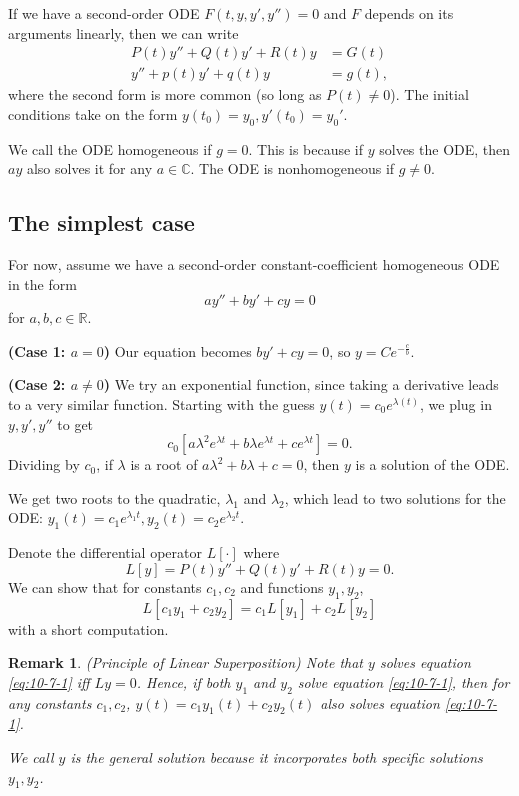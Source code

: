 \documentclass{tufte-handout}
\newcommand*\R{\mathbb{R}}
\newtheorem{rmk}[thm]{Remark}
\theoremstyle{definition}
\begin{document}
If we have a second-order ODE $F(t,y,y',y'') = 0$ and $F$ depends on its arguments linearly, then we can write
\begin{align}
	P(t) y'' + Q(t) y' + R(t) y &= G(t) \\ 
	y'' + p(t) y' + q(t)y &= g(t) \label{eq:10-7-1}
,\end{align} 
where the second form is more common (so long as $P(t) \ne 0$). The initial conditions take on the form $y(t_0) = y_0, y'(t_0) = y_0'$.

We call the ODE homogeneous if $g = 0$. This is because if $y$ solves the ODE, then $ay$ also solves it for any $a \in \mathbb{C}$. The ODE is nonhomogeneous if $g \ne 0$.

\subsection{The simplest case}
For now, assume we have a second-order constant-coefficient homogeneous ODE in the form \[
	ay'' + by' + cy = 0
\] for $a,b,c \in \R$.

\textbf{(Case 1: $a = 0$)} Our equation becomes $by' + cy = 0$, so $y = C e^{-\frac{c}{b}}$.

\textbf{(Case 2: $a \ne 0$)} We try an exponential function, since taking a derivative leads to a very similar function. Starting with the guess $y(t) = c_0 e^{\lambda(t)}$, we plug in $y,y',y''$ to get
\begin{equation}
	c_0\left[ a \lambda^2 e^{\lambda t} + b\lambda e^{\lambda t} + c e^{\lambda t} \right] = 0 \label{eq:10-7-2}
.\end{equation} Dividing by $c_0$, if $\lambda$ is a root of $a\lambda^2 + b\lambda + c = 0$, then $y$ is a solution of the ODE.

We get two roots to the quadratic, $\lambda_1$ and $\lambda_2$, which lead to two solutions for the ODE: $y_1(t) = c_1 e^{\lambda_1 t}, y_2(t) = c_2 e^{\lambda_2 t}$.

Denote the differential operator $L[\cdot]$ where \[
	L[y] = P(t) y'' + Q(t) y' + R(t)y = 0
.\] We can show that for constants $c_1,c_2$ and functions $y_1,y_2$, \[
L[c_1y_1 + c_2y_2] = c_1 L[y_1] + c_2 L[y_2]
\] with a short computation.

\begin{rmk}
	(Principle of Linear Superposition) 
	Note that $y$ solves equation \ref{eq:10-7-1} iff $Ly = 0$. Hence, if both $y_1$ and $y_2$ solve equation \ref{eq:10-7-1}, then for any constants $c_1,c_2$, $y(t) = c_1 y_1(t) + c_2 y_2(t)$ also solves equation \ref{eq:10-7-1}.

	We call $y$ is the general solution because it incorporates both specific solutions $y_1, y_2$.
\end{rmk}
\end{document}
